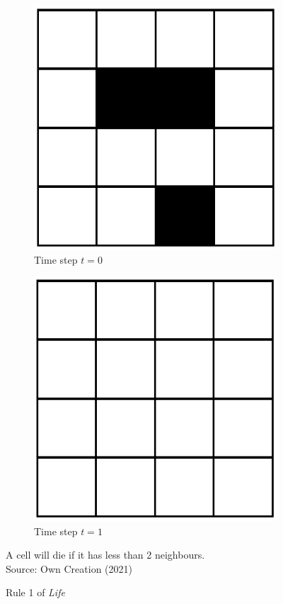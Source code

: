 \begin{figure}[H]
\centering
\begin{subfigure}{.5\textwidth}
  \centering
  \includegraphics[width=.4\linewidth]{Figures/Chapter2/rule1}
  \caption{Time step $t = 0$}
\end{subfigure}%
\begin{subfigure}{.5\textwidth}
  \centering
  \includegraphics[width=.4\linewidth]{Figures/Chapter2/rule1.1}
  \caption{Time step $t = 1$}
\end{subfigure}
\caption{Rule 1 of \textsl{Life}}
\begin{center}
A cell will die if it has less than 2 neighbours.\\
Source: Own Creation (2021)
\end{center}
\end{figure}

